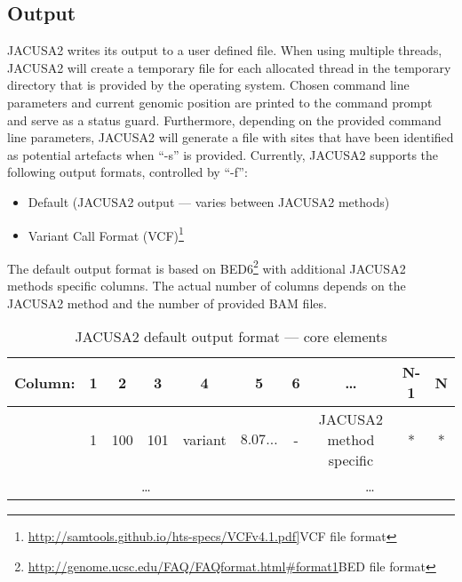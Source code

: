 \documentclass[10pt,a4paper,draft]{article}
\begin{document}
\subsection{Output}
JACUSA2 writes its output to a user defined file. When using multiple threads, JACUSA2 will
create a temporary file for each allocated thread in the temporary directory that is 
provided by the operating system. 
Chosen command line parameters and current genomic position are printed to the command prompt and serve as a status guard.
Furthermore, depending on the provided command line parameters, JACUSA2 will generate a file with sites that have been
identified as potential artefacts when ``-s'' is provided. Currently, JACUSA2 supports the following
output formats, controlled by ``-f'':
\begin{itemize}
  \item Default (JACUSA2 output --- varies between JACUSA2 methods)
  \item Variant Call Format (VCF)\footnote{\url{http://samtools.github.io/hts-specs/VCFv4.1.pdf]}{VCF file format}}
\end{itemize}
The default output format is based on
BED6\footnote{\url{http://genome.ucsc.edu/FAQ/FAQformat.html\#format1}{BED file format}} with
additional JACUSA2 methods specific columns. The actual number of columns depends on the JACUSA2 
method and the number of provided BAM files.
\begin{table}[ht]
\caption{JACUSA2 default output format --- core elements}
{\small
\begin{tabular}{lcccccc|ccc}
Column: & 1 & 2 & 3 & 4 & 5 & 6 & \ldots & N-1 & N \\
\hline
& 1 & 100 & 101 & variant & $8.07\ldots$ & - & JACUSA2 method specific & * & * \\	
\multicolumn{6}{c|}{\ldots} & \multicolumn{4}{c}{\ldots}
\end{tabular}}
\end{table}
\end{document}
